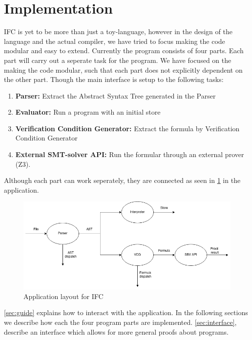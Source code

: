 \section{Implementation}\label{sec:implementation}
IFC is yet to be more than just a toy-language, however in the design of the language and the actual compiler, we have tried to focus making the code modular and easy to extend.
Currently the program consists of four parts. Each part will carry out a seperate task for the program. We have focused on the making the code modular, such that each part does not explicitly dependent on the other part. Though the main interface is setup to the following tasks:
\begin{enumerate}
  \item \textbf{Parser:} Extract the Abstract Syntax Tree generated in the Parser
  \item \textbf{Evaluator:} Run a program with an initial store
  \item \textbf{Verification Condition Generator:} Extract the formula by Verification Condition Generator
  \item \textbf{External SMT-solver API:} Run the formular through an external prover (Z3).
\end{enumerate}
Although each part can work seperately, they are connected as seen in \cref{fig:flow} in the application.

\begin{figure}[h]
  \includegraphics[width=\linewidth]{Implementation/IFCflow.png}
  \caption{Application layout for IFC}
  \label{fig:flow}
\end{figure}

\cref{sec:guide} explains how to interact with the application. In the following sections we describe how each the four program parts are implemented. \cref{sec:interface}, describe an interface which allows for more general proofs about programs.










